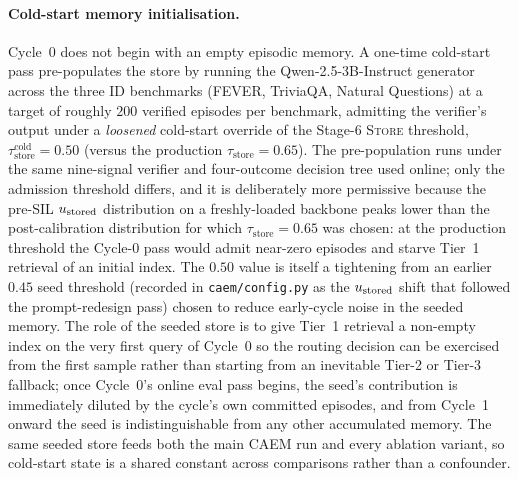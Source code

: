 \paragraph{Cold-start memory initialisation.}
Cycle~0 does not begin with an empty episodic memory. A one-time cold-start pass pre-populates the store by running the Qwen-2.5-3B-Instruct generator across the three ID benchmarks (FEVER, TriviaQA, Natural Questions) at a target of roughly $200$ verified episodes per benchmark, admitting the verifier's output under a \emph{loosened} cold-start override of the Stage-6 \textsc{Store} threshold, $\tau_{\text{store}}^{\text{cold}} = 0.50$ (versus the production $\tau_{\text{store}} = 0.65$). The pre-population runs under the same nine-signal verifier and four-outcome decision tree used online; only the admission threshold differs, and it is deliberately more permissive because the pre-SIL $u_{\text{stored}}$ distribution on a freshly-loaded backbone peaks lower than the post-calibration distribution for which $\tau_{\text{store}} = 0.65$ was chosen: at the production threshold the Cycle-0 pass would admit near-zero episodes and starve Tier~1 retrieval of an initial index. The $0.50$ value is itself a tightening from an earlier $0.45$ seed threshold (recorded in \texttt{caem/config.py} as the $u_{\text{stored}}$ shift that followed the prompt-redesign pass) chosen to reduce early-cycle noise in the seeded memory. The role of the seeded store is to give Tier~1 retrieval a non-empty index on the very first query of Cycle~0 so the routing decision can be exercised from the first sample rather than starting from an inevitable Tier-2 or Tier-3 fallback; once Cycle~0's online eval pass begins, the seed's contribution is immediately diluted by the cycle's own committed episodes, and from Cycle~1 onward the seed is indistinguishable from any other accumulated memory. The same seeded store feeds both the main CAEM run and every ablation variant, so cold-start state is a shared constant across comparisons rather than a confounder.

